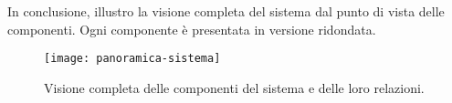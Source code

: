 In conclusione, illustro la visione completa del sistema 
dal punto di vista delle componenti. Ogni componente 
è presentata in versione ridondata.
\newpage
\begin{figure}[htbp]
	\begin{center}
		\texttt{[image: panoramica-sistema]}
		\caption{Visione completa delle componenti del sistema e delle loro relazioni.}
	\end{center}
\end{figure}
\newpage
